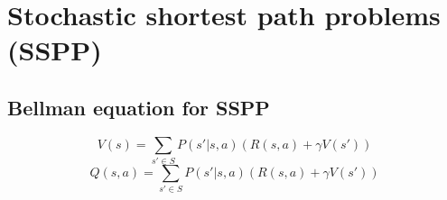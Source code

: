 \section{Stochastic shortest path problems (SSPP)}

\subsection{Bellman equation for SSPP}

\begin{equation}
    V(s) = \sum_{s' \in S} P(s' | s, a) \left( R(s, a) + \gamma V(s') \right)
\end{equation}
\begin{equation}
    Q(s, a) = \sum_{s' \in S} P(s' | s, a) \left( R(s, a) + \gamma V(s') \right)
\end{equation}
